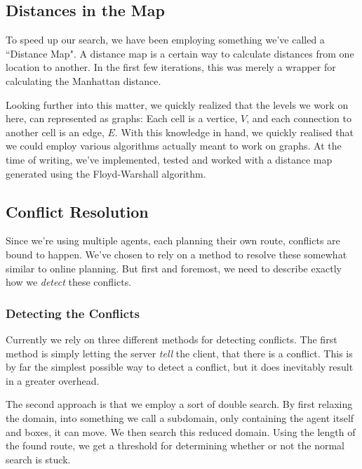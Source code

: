 \documentclass[letterpaper]{article}
\begin{document}
	\subsection{Distances in the Map}
		To speed up our search, we have been employing something we've called a ``Distance Map". A distance map is a certain way to calculate distances from one location to another. In the first few iterations, this was merely a wrapper for calculating the Manhattan distance.

		Looking further into this matter, we quickly realized that the levels we work on here, can represented as graphs: Each cell is a vertice, $V$, and each connection to another cell is an edge, $E$. With this knowledge in hand, we quickly realised that we could employ various algorithms actually meant to work on graphs. At the time of writing, we've implemented, tested and worked with a distance map generated using the Floyd-Warshall algorithm.

	\subsection{Conflict Resolution}
		Since we're using multiple agents, each planning their own route, conflicts are bound to happen. We've chosen to rely on a method to resolve these somewhat similar to online planning. But first and foremost, we need to describe exactly how we \emph{detect} these conflicts.

		\subsubsection{Detecting the Conflicts}
			Currently we rely on three different methods for detecting conflicts. The first method is simply letting the server \emph{tell} the client, that there is a conflict. This is by far the simplest possible way to detect a conflict, but it does inevitably result in a greater overhead. 

			The second approach is that we employ a sort of double search. By first relaxing the domain, into something we call a subdomain, only containing the agent itself and boxes, it can move. We then search this reduced domain. Using the length of the found route, we get a threshold for determining whether or not the normal search is stuck.


\end{document}
